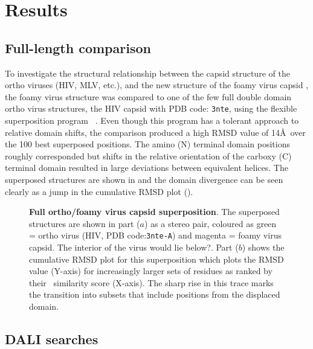 \section{Results}

\subsection{Full-length comparison}

To investigate the structural relationship between the capsid structure of the ortho viruses (HIV, MLV, etc.),
and the new structure of the foamy virus capsid \cite{Ian}, the foamy virus structure was compared to one
of the few full double domain ortho virus structures, the HIV capsid with PDB code: {\tt 3nte}, using the
flexible superposition program \SAP\ \cite{TaylorWR99a}.   Even though this program has a tolerant approach
to relative domain shifts, the comparison produced a high RMSD value of 14\AA\ over the 100 best superposed
positions.   The amino (N) terminal domain positions roughly corresponded but shifts in the relative
orientation of the carboxy (C) terminal domain resulted in large deviations between equivalent helices.  
The superposed structures are shown in  and the domain divergence can be seen clearly as a
jump in the cumulative RMSD plot ().

\begin{figure}
\centering
{}
\begin{footnotesize}
\caption{
\label{Fig:full}
{\bf Full ortho/foamy virus capsid superposition}.
The superposed structures are shown in part ($a$) as a stereo pair, coloured as green = ortho virus (HIV, PDB code:{\tt 3nte-A})
and magenta = foamy virus capsid.   The interior of the virus would lie below?. 
Part ($b$) shows the cumulative RMSD plot for this superposition which plots the RMSD value (Y-axis) for increasingly larger sets
of residues as ranked by their \SAP\ similarity score (X-axis).   The sharp rise in this trace marks the transition into 
subsets that include positions from the displaced domain.
}
\end{footnotesize}
\end{figure}

\subsection{DALI searches}

